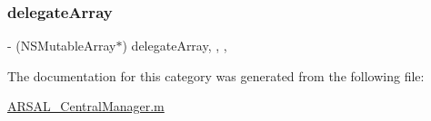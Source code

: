 \hypertarget{categoryARSAL__CentralManager_07_08_a23828b5d378b496dd4f9950e15dee279}{}\label{categoryARSAL__CentralManager_07_08_a23828b5d378b496dd4f9950e15dee279} 
\subsubsection{\texorpdfstring{delegate\+Array}{delegateArray}}
{\footnotesize\ttfamily -\/ (N\+S\+Mutable\+Array$\ast$) delegate\+Array\hspace{0.3cm}{\ttfamily [read]}, {\ttfamily [write]}, {\ttfamily [nonatomic]}, {\ttfamily [strong]}}



The documentation for this category was generated from the following file\+:\begin{DoxyCompactItemize}
\item 
\hyperlink{ARSAL__CentralManager_8m}{A\+R\+S\+A\+L\+\_\+\+Central\+Manager.\+m}\end{DoxyCompactItemize}

